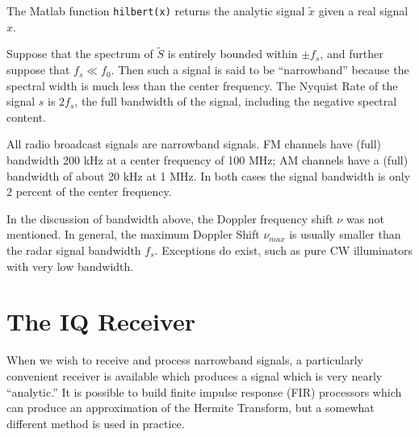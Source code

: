 \begin{factoid}
The Matlab function {\protect\texttt{hilbert(x)}} returns the analytic signal
$\tilde{x}$ given a real signal $x$.
\end{factoid}

Suppose that the spectrum of $\tilde{S}$ is entirely bounded within
$\pm f_s$, and further suppose that $f_s \ll f_0$.  Then such a
signal is said to be ``narrowband'' because the spectral width is much
less than the center frequency.  The Nyquist Rate of the signal $s$ is
$2 f_s$, the full bandwidth of the signal, including the negative
spectral content.

\begin{factoid} All radio broadcast signals are narrowband signals.
   FM channels have (full) bandwidth 200 kHz at a center frequency of
   100 MHz; AM channels have a (full) bandwidth of about 20 kHz at 1
   MHz.  In both cases the signal bandwidth is only 2 percent of the
   center frequency.
\end{factoid}

In the discussion of bandwidth above, the Doppler frequency shift
$\nu$ was not mentioned.  In general, the maximum Doppler Shift
$\nu_{max}$ is usually smaller than the radar signal bandwidth $f_s$.
Exceptions do exist, such as pure CW illuminators with very low
bandwidth.

\section{The IQ Receiver}

When we wish to receive and process narrowband signals, a particularly
convenient receiver is available which produces a signal which is very
nearly ``analytic.''  It is possible to build finite impulse response
(FIR) processors which can produce an approximation of the Hermite
Transform, but a somewhat different method is used in practice.

